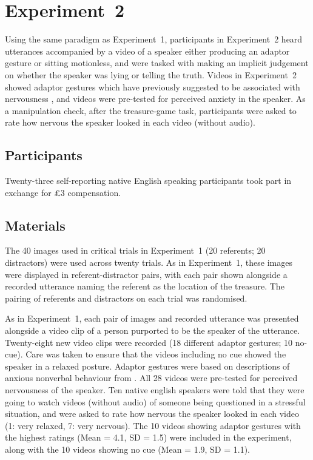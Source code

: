 \documentclass[a4paper,man,natbib]{apa6}
\begin{document}
\section{Experiment~2}
Using the same paradigm as Experiment~1, participants in Experiment~2 heard utterances accompanied by a video of a speaker either producing an adaptor gesture or sitting motionless, and were tasked with making an implicit judgement on whether the speaker was lying or telling the truth.
Videos in Experiment~2 showed adaptor gestures which have previously suggested to be associated with nervousness \citep[See][]{Gregersen2005}, and videos were pre-tested for perceived anxiety in the speaker.
As a manipulation check, after the treasure-game task, participants were asked to rate how nervous the speaker looked in each video (without audio).

\subsection{Participants}
Twenty-three self-reporting native English speaking participants took part in exchange for \pounds{}3 compensation.


\subsection{Materials}
The 40 images used in critical trials in Experiment~1 (20 referents; 20 distractors) were used across twenty trials.
As in Experiment~1, these images were displayed in referent-distractor pairs, with each pair shown alongside a recorded utterance naming the referent as the location of the treasure.
The pairing of referents and distractors on each trial was randomised.

As in Experiment~1, each pair of images and recorded utterance was presented alongside a video clip of a person purported to be the speaker of the utterance.
Twenty-eight new video clips were recorded (18 different adaptor gestures; 10 no-cue). 
Care was taken to ensure that the videos including no cue showed the speaker in a relaxed posture. 
Adaptor gestures were based on descriptions of anxious nonverbal behaviour from \citet{Gregersen2005}.
All 28 videos were pre-tested for perceived nervousness of the speaker.
Ten native english speakers were told that they were going to watch videos (without audio) of someone being questioned in a stressful situation, and were asked to rate how nervous the speaker looked in each video (1: very relaxed, 7: very nervous). 
The 10 videos showing adaptor gestures with the highest ratings (Mean = 4.1, SD = 1.5) were included in the experiment, along with the 10 videos showing no cue (Mean = 1.9, SD = 1.1).
\end{document}
